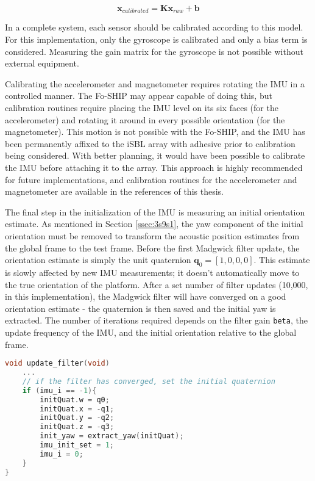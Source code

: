\documentclass[12pt,a4paper]{report}
\begin{document}
\begin{equation} \label{eq:compf}
	\mathbf{x}_{calibrated} = \mathbf{K}\mathbf{x}_{raw} + \mathbf{b}
\end{equation}

In a complete system, each sensor should be calibrated according to this model. For this implementation, only the gyroscope is calibrated and only a bias term is considered. Measuring the gain matrix for the gyroscope is not possible without external equipment.

Calibrating the accelerometer and magnetometer requires rotating the IMU in a controlled manner. The Fo-SHIP may appear capable of doing this, but calibration routines require placing the IMU level on its six faces (for the accelerometer) and rotating it around in every possible orientation (for the magnetometer). This motion is not possible with the Fo-SHIP, and the IMU has been permanently affixed to the iSBL array with adhesive prior to calibration being considered. With better planning, it would have been possible to calibrate the IMU before attaching it to the array. This approach is highly recommended for future implementations, and calibration routines for the accelerometer \cite{imucal} and magnetometer \cite{magcal} are available in the references of this thesis.

The final step in the initialization of the IMU is measuring an initial orientation estimate. As mentioned in Section \ref{ssec:3s9s1}, the yaw component of the initial orientation must be removed to transform the acoustic position estimates from the global frame to the test frame. Before the first Madgwick filter update, the orientation estimate is simply the unit quaternion \(\mathbf{q}_0 = [1, 0, 0, 0]\). This estimate is slowly affected by new IMU measurements; it doesn’t automatically move to the true orientation of the platform. After a set number of filter updates (10,000, in this implementation), the Madgwick filter will have converged on a good orientation estimate - the quaternion is then saved and the initial yaw is extracted. The number of iterations required depends on the filter gain \verb|beta|, the update frequency of the IMU, and the initial orientation relative to the global frame.

\begin{lstlisting}[language=C++]
void update_filter(void)
	...
	// if the filter has converged, set the initial quaternion
	if (imu_i == -1){
		initQuat.w = q0;
		initQuat.x = -q1;
		initQuat.y = -q2;
		initQuat.z = -q3;
		init_yaw = extract_yaw(initQuat);
		imu_init_set = 1;
		imu_i = 0;
	}
}
\end{lstlisting}
\end{document}
